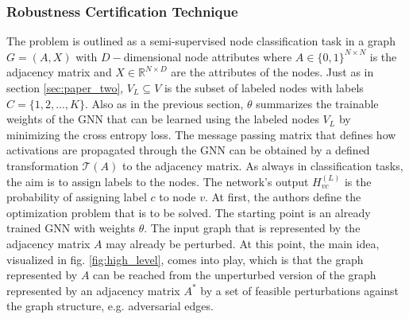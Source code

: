 \documentclass[a4paper,preprint]{sig-alternate}
\begin{document}
\subsubsection{Robustness Certification Technique}

The problem is outlined as a semi-supervised node classification task in a graph $G = (A, X)$ with $D-$dimensional node attributes
where $A \in \{0, 1\}^{N \times N}$ is the adjacency matrix and $X \in \mathbb{R}^{N \times D}$ are the attributes of the nodes.
Just as in section \ref{sec:paper_two}, $V_L \subseteq V$ is the subset of labeled nodes with labels $C = \{1, 2, ..., K\}$.
Also as in the previous section, $\theta$ summarizes the trainable weights of the GNN that can be learned using the labeled nodes $V_L$
by minimizing the cross entropy loss. \cite{10.1145/3394486.3403217}
The message passing matrix that defines how activations are propagated through the GNN can be obtained
by a defined transformation $\mathcal{T}(A)$ to the adjacency matrix. \cite{10.1145/3394486.3403217}
As always in classification tasks, the aim is to assign labels to the nodes.
The network's output $H_{vc}^{(L)}$ is the probability of assigning label $c$ to node $v$. \cite{10.1145/3394486.3403217}\newline
At first, the authors define the optimization problem that is to be solved.
The starting point is an already trained GNN with weights $\theta$. The input graph that is represented by the adjacency matrix $A$
may already be perturbed. At this point, the main idea, visualized in fig. \ref{fig:high_level}, comes into play, which is that
the graph represented by $A$ can be reached from the  unperturbed version of the graph represented by an adjacency 
matrix $A^{\ast}$ by a set of feasible perturbations against the graph structure, e.g. adversarial edges. \cite{10.1145/3394486.3403217}

\vfill
\pagebreak
\end{document}

